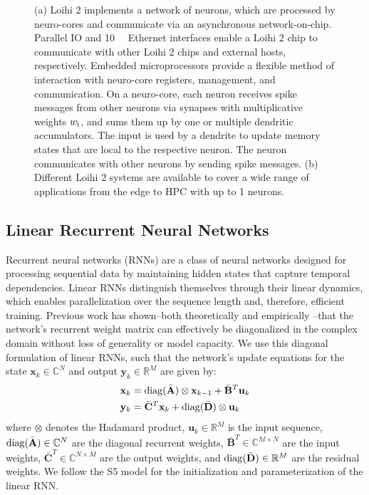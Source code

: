 \begin{figure*}[t]
  \centering
  \quad
  \caption{(a) Loihi 2 implements a network of neurons, which are processed by neuro-cores and communicate via an asynchronous network-on-chip. Parallel IO and \qty{10}{\giga\bit} Ethernet interfaces enable a Loihi 2 chip to communicate with other Loihi 2 chips and external hosts, respectively. Embedded microprocessors provide a flexible method of interaction with neuro-core registers, management, and communication. On a neuro-core, each neuron receives spike messages from other neurons via synapses with multiplicative weights $w_\textnormal{i}$, and sums them up by one or multiple dendritic accumulators. The input is used by a dendrite to update memory states that are local to the respective neuron. The neuron communicates with other neurons by sending spike messages. (b) Different Loihi 2 systems are available to cover a wide range of applications from the edge to HPC with up to \qty{1}{\billion} neurons.}
  \label{fig:loihi2}
  \vspace{-0.2cm}
\end{figure*}

\subsection{Linear Recurrent Neural Networks}
\label{ss:linear-rnns}

Recurrent neural networks (RNNs) are a class of neural networks designed for processing sequential data by maintaining hidden states that capture temporal dependencies.
Linear RNNs distinguish themselves through their linear dynamics, which enables parallelization over the sequence length and, therefore, efficient training.
Previous work has shown--both theoretically \cite{DBLP:conf/icml/OrvietoDGPS24} and empirically \cite{DBLP:conf/nips/GuG0R22}--that the network's recurrent weight matrix can effectively be diagonalized in the complex domain without loss of generality or model capacity.
We use this diagonal formulation of linear RNNs, such that the network's update equations for the state $\mathbf{x}_k \in \mathbb{C}^{N}$ and output $\mathbf{y}_k \in \mathbb{R}^{M}$ are given by:
% 
\begin{align}
    \label{eq:x_k}
    \mathbf{x}_{k} & = \operatorname{diag}(\bar{\mathbf{A}})\otimes\mathbf{x}_{k-1} + \bar{\mathbf{B}}^T\mathbf{u}_{k} \\
    \mathbf{y}_{k} & = \bar{\mathbf{C}}^T\mathbf{x}_{k} + \operatorname{diag}(\bar{\mathbf{D}})\otimes\mathbf{u}_{k}
\end{align}
%
where $\otimes$ denotes the Hadamard product, 
$\mathbf{u}_k \in \mathbb{R}^M$ is the input sequence, 
$\operatorname{diag}(\bar{\mathbf{A}}) \in \mathbb{C}^{N}$ are the diagonal recurrent weights, 
$\bar{\mathbf{B}}^T \in \mathbb{C}^{M \times N}$ are the input weights, 
$\bar{\mathbf{C}}^T \in \mathbb{C}^{N \times M}$ are the output weights, and 
$\operatorname{diag}(\bar{\mathbf{D}}) \in \mathbb{R}^{M}$ are the residual weights.
%
We follow the S5 model \cite{DBLP:conf/iclr/SmithWL23} for the initialization and parameterization of the linear RNN. 

